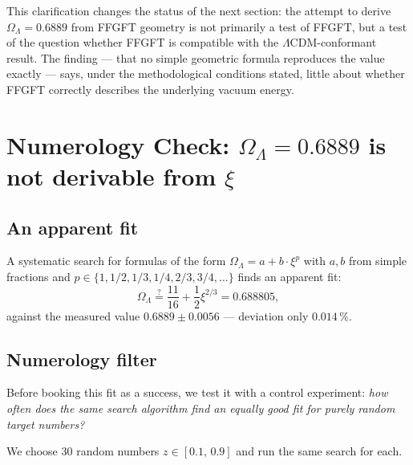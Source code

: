 This clarification changes the status of the next section: the attempt to derive \(\Omega_\Lambda = 0.6889\) from FFGFT geometry is not primarily a test of FFGFT, but a test of the question whether FFGFT is compatible with the \(\Lambda\)CDM-conformant result. The finding --- that no simple geometric formula reproduces the value exactly --- says, under the methodological conditions stated, little about whether FFGFT correctly describes the underlying vacuum energy.

\section[Numerology check: Omega-Lambda is not derivable from xi]{Numerology Check: \texorpdfstring{\(\Omega_\Lambda = 0.6889\)}{Omega-Lambda = 0.6889} is not derivable from \texorpdfstring{\(\xi\)}{xi}}
\label{sec:numerologie}

\subsection{An apparent fit}

A systematic search for formulas of the form \(\Omega_\Lambda = a + b \cdot \xi^p\) with \(a, b\) from simple fractions and \(p \in \{1, 1/2, 1/3, 1/4, 2/3, 3/4, \dots\}\) finds an apparent fit:
\begin{equation}
\Omega_\Lambda \stackrel{?}{=} \frac{11}{16} + \frac{1}{2} \xi^{2/3} = 0.688805,
\end{equation}
against the measured value \(0.6889 \pm 0.0056\) --- deviation only \(0.014\,\%\).

\subsection{Numerology filter}

Before booking this fit as a success, we test it with a control experiment: \emph{how often does the same search algorithm find an equally good fit for purely random target numbers?}

We choose 30 random numbers \(z \in [0.1,\, 0.9]\) and run the same search for each.

\begin{table}[h]
\centering
\caption{Numerology filter: distribution of random ``hits''}
\end{table}

